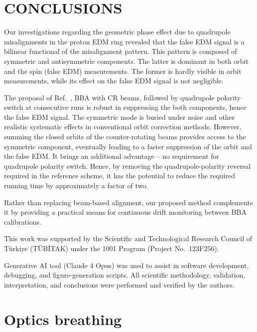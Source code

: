 \documentclass[aps,prab,reprint,superscriptaddress,nofootinbib]{revtex4-2}
\begin{document}
	\section{CONCLUSIONS}
	\label{sec:conclusion}

	Our investigations regarding the geometric phase effect due to quadrupole misalignments in the proton EDM ring revealed that the false EDM signal is a bilinear functional of the misalignment pattern. This pattern is composed of symmetric and antisymmetric components. The latter is dominant in both orbit and the spin (false EDM) measurements. The former is hardly visible in orbit measurements, while its effect on the false EDM signal is not negligible.

	The proposal of Ref.~\cite{omarov}, BBA with CR beams, followed by quadrupole polarity switch at consecutive runs is robust in suppressing the both components, hence the false EDM signal. The symmetric mode is buried under noise and other realistic systematic effects in conventional orbit correction methods. However, summing the closed orbits of the counter-rotating beams provides access to the symmetric component, eventually leading to a faster suppression of the orbit and the false EDM. It brings an additional advantage -- no requirement for quadrupole polarity switch. Hence, by removing the quadrupole-polarity reversal required in the reference scheme, it has the potential to reduce the required running time by approximately a factor of two.

	Rather than replacing beam-based alignment, our proposed method complements it by providing a practical means for continuous drift monitoring between BBA calibrations.

	\begin{acknowledgments}

	This work was supported by the Scientific and Technological Research Council of Türkiye (TÜBİTAK) under the 1001 Program (Project No.~123F256).

	Generative AI tool (Claude 4 Opus) was used to assist in software development, debugging, and figure-generation scripts. All scientific methodology, validation, interpretation, and conclusions were performed and verified by the authors.
\end{acknowledgments}


	\appendix

	\section{Optics breathing}
	\label{app:breathing}
\end{document}
